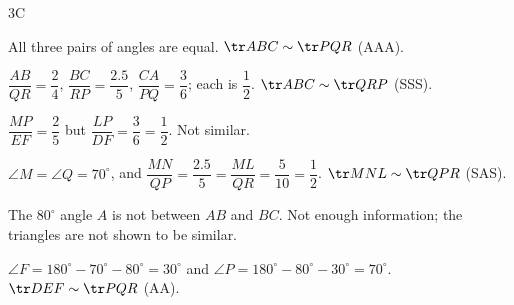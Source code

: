\begin{exercise}{3C}
\begin{center}
\end{center}
\begin{solution}
\begin{steps}
  \item[(i)] All three pairs of angles are equal. $\tr ABC\sim\tr PQR$ (AAA).
  \item[(ii)] $\dfrac{AB}{QR}=\dfrac24$, $\dfrac{BC}{RP}=\dfrac{2.5}{5}$, $\dfrac{CA}{PQ}=\dfrac36$; each is $\dfrac12$. $\tr ABC\sim\tr QRP$ (SSS).
  \item[(iii)] $\dfrac{MP}{EF}=\dfrac25$ but $\dfrac{LP}{DF}=\dfrac36=\dfrac12$. Not similar.
  \item[(iv)] $\angle M=\angle Q=70^\circ$, and $\dfrac{MN}{QP}=\dfrac{2.5}{5}=\dfrac{ML}{QR}=\dfrac{5}{10}=\dfrac12$. $\tr MNL\sim\tr QPR$ (SAS).
  \item[(v)] The $80^\circ$ angle $A$ is not between $AB$ and $BC$. Not enough information; the triangles are not shown to be similar.
  \item[(vi)] $\angle F=180^\circ-70^\circ-80^\circ=30^\circ$ and $\angle P=180^\circ-80^\circ-30^\circ=70^\circ$. $\tr DEF\sim\tr PQR$ (AA).
\end{steps}
\end{solution}
\end{exercise}
